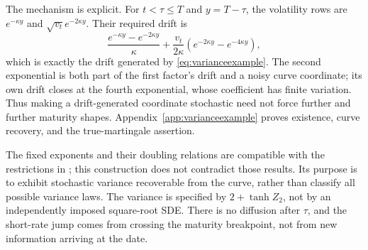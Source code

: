 The mechanism is explicit. For $t<\tau\le T$ and $y=T-\tau$, the volatility rows are $e^{-\kappa y}$ and $\sqrt{v_t}e^{-2\kappa y}$. Their required drift is
\[
\frac{e^{-\kappa y}-e^{-2\kappa y}}{\kappa}
  +\frac{v_t}{2\kappa}(e^{-2\kappa y}-e^{-4\kappa y}),
\]
which is exactly the drift generated by \eqref{eq:varianceexample}. The second exponential is both part of the first factor's drift and a noisy curve coordinate; its own drift closes at the fourth exponential, whose coefficient has finite variation. Thus making a drift-generated coordinate stochastic need not force further and further maturity shapes. Appendix~\ref{app:varianceexample} proves existence, curve recovery, and the true-martingale assertion.

The fixed exponents and their doubling relations are compatible with the restrictions in \citet{filipovic2000exponential}; this construction does not contradict those results. Its purpose is to exhibit stochastic variance recoverable from the curve, rather than classify all possible variance laws. The variance is specified by $2+\tanh Z_2$, not by an independently imposed square-root SDE. There is no diffusion after $\tau$, and the short-rate jump comes from crossing the maturity breakpoint, not from new information arriving at the date.
